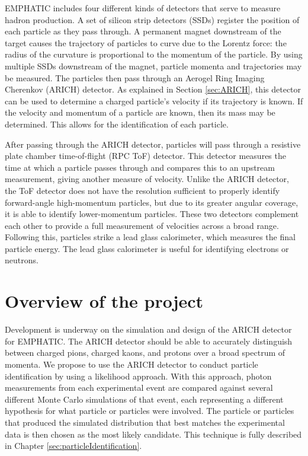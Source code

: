 EMPHATIC includes four different kinds of detectors that serve to measure hadron production.
A set of silicon strip detectors (SSDs) register the position of each particle as they pass through.
A permanent magnet downstream of the target causes the trajectory of particles to curve due to the Lorentz force: the radius of the curvature is proportional to the momentum of the particle.
By using multiple SSDs downstream of the magnet, particle momenta and trajectories may be measured.
The particles then pass through an Aerogel Ring Imaging Cherenkov (ARICH) detector.
As explained in Section \ref{sec:ARICH}, this detector can be used to determine a charged particle's velocity if its trajectory is known. 
If the velocity and momentum of a particle are known, then its mass may be determined.
This allows for the identification of each particle. 

After passing through the ARICH detector, particles will pass through a resistive plate chamber time-of-flight (RPC ToF) detector.
This detector measures the time at which a particle passes through and compares this to an upstream measurement, giving another measure of velocity. 
Unlike the ARICH detector, the ToF detector does not have the resolution sufficient to properly identify forward-angle high-momentum particles, but due to its greater angular coverage, it is able to identify lower-momentum particles.
These two detectors complement each other to provide a full measurement of velocities across a broad range.
Following this, particles strike a lead glass calorimeter, which measures the final particle energy.
The lead glass calorimeter is useful for identifying electrons or neutrons.

\section{Overview of the project}
Development is underway on the simulation and design of the ARICH detector for EMPHATIC.
The ARICH detector should be able to accurately distinguish between charged pions, charged kaons, and protons over a broad spectrum of momenta.
We propose to use the ARICH detector to conduct particle identification by using a likelihood approach. 
With this approach, photon measurements from each experimental event are compared against several different Monte Carlo simulations of that event, each representing a different hypothesis for what particle or particles were involved.
The particle or particles that produced the simulated distribution that best matches the experimental data is then chosen as the most likely candidate.
This technique is fully described in Chapter \ref{sec:particleIdentification}. 

